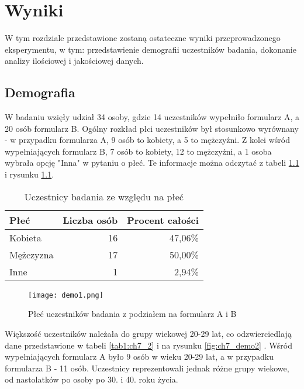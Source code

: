\graphicspath{{chapters/chapter7/imgs/}}

\chapter{Wyniki}\label{chapter:ch7}

W tym rozdziale przedstawione zostaną ostateczne wyniki przeprowadzonego eksperymentu, w tym: przedstawienie
demografii uczestników badania, dokonanie analizy ilościowej i jakościowej danych.

\section{Demografia}\label{section:ch7_1}

W badaniu wzięły udział 34 osoby, gdzie 14 uczestników wypełniło formularz A, a 20 osób formularz B.
Ogólny rozkład płci uczestników był stosunkowo wyrównany - w przypadku formularza A, 9 osób to kobiety, a 5 to
mężczyźni. Z kolei wśród wypełniających formularz B, 7 osób to kobiety, 12 to mężczyźni, a 1 osoba wybrała
opcję "Inna" w pytaniu o płeć. Te informacje można odczytać z tabeli \ref{tab1:ch7_1} i rysunku \ref{fig:ch7_demo1}.

\begin{table}[h!]
    \begin{center}
        \begin{tabular}{|l|r|r|}
            \hline
            Płeć      & Liczba osób & Procent całości \\
            \hline
            Kobieta   & 16          & 47,06\%         \\
            Mężczyzna & 17          & 50,00\%         \\
            Inne      & 1           & 2,94\%          \\
            \hline
        \end{tabular}
    \end{center}
    \caption{Uczestnicy badania ze względu na płeć}\label{tab1:ch7_1}
\end{table}

\begin{figure}[h!]
    \centering
    \texttt{[image: demo1.png]}
    \caption{Płeć uczestników badania z podziałem na formularz A i B}
    \label{fig:ch7_demo1}
\end{figure}

\newpage

Większość uczestników należała do grupy wiekowej 20-29 lat, co odzwierciedlają dane przedstawione w
tabeli \ref{tab1:ch7_2} i na rysunku \ref{fig:ch7_demo2} . Wśród wypełniających formularz A było 9 osób
w wieku 20-29 lat, a w przypadku formularza B - 11 osób. Uczestnicy reprezentowali jednak różne grupy
wiekowe, od nastolatków po osoby po 30. i 40. roku życia.

